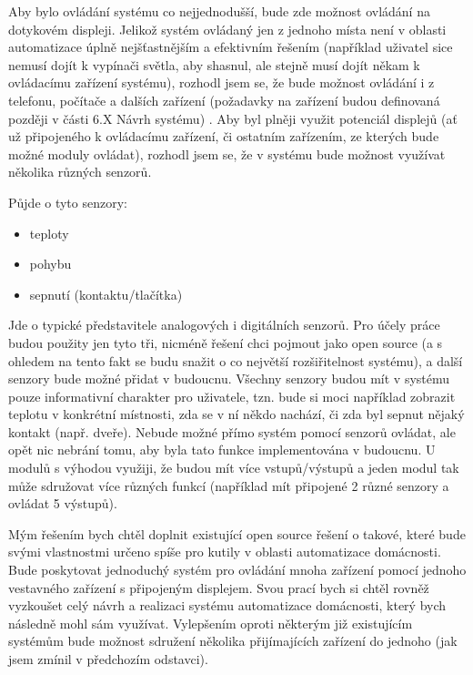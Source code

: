Aby bylo ovládání systému co nejjednodušší, bude zde možnost ovládání na dotykovém displeji. Jelikož systém ovládaný jen z jednoho místa není v oblasti automatizace úplně nejšťastnějším a efektivním řešením (například uživatel sice nemusí dojít k vypínači světla, aby shasnul, ale stejně musí dojít někam k ovládacímu zařízení systému), rozhodl jsem se, že bude možnost ovládání i z telefonu, počítače a dalších zařízení (požadavky na zařízení budou definovaná později v části 6.X Návrh systému) . Aby byl plněji využit potenciál displejů (ať už připojeného k ovládacímu zařízení, či ostatním zařízením, ze kterých bude možné moduly ovládat), rozhodl jsem se, že v systému bude možnost využívat několika různých senzorů.

Půjde o tyto senzory:
\begin{itemize}
    \item teploty
    \item pohybu
    \item sepnutí (kontaktu/tlačítka)
\end{itemize}
Jde o typické představitele analogových i digitálních senzorů. Pro účely práce budou použity jen tyto tři, nicméně řešení chci pojmout jako open source (a s ohledem na tento fakt se budu snažit o co největší rozšiřitelnost systému), a další senzory bude možné přidat v budoucnu. Všechny senzory budou mít v systému pouze informativní charakter pro uživatele, tzn. bude si moci například zobrazit teplotu v konkrétní místnosti, zda se v ní někdo nachází, či zda byl sepnut nějaký kontakt (např. dveře). Nebude možné přímo systém pomocí senzorů ovládat, ale opět nic nebrání tomu, aby byla tato funkce implementována v budoucnu. U modulů s výhodou využiji, že budou mít více vstupů/výstupů a jeden modul tak může sdružovat více různých funkcí (například mít připojené 2 různé senzory a ovládat 5 výstupů).

Mým řešením bych chtěl doplnit existující open source řešení o takové, které bude svými vlastnostmi určeno spíše pro kutily v oblasti automatizace domácnosti. Bude poskytovat jednoduchý systém pro ovládání mnoha zařízení pomocí jednoho vestavného zařízení s připojeným displejem. Svou prací bych si chtěl rovněž vyzkoušet celý návrh a realizaci systému automatizace domácnosti, který bych následně mohl sám využívat. Vylepšením oproti některým již existujícím systémům bude možnost sdružení několika přijímajících zařízení do jednoho (jak jsem zmínil v předchozím odstavci).

